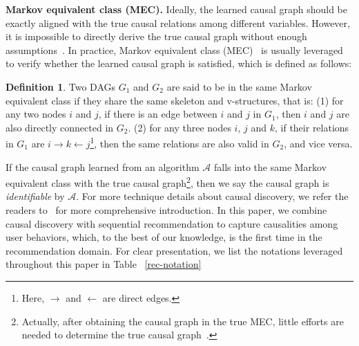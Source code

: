 \documentclass[conference]{IEEEtran}
\theoremstyle{definition}
\newtheorem{definition}{Definition}
\theoremstyle{theorem}
\theoremstyle{proof}
\theoremstyle{remark}
\begin{document}
\noindent
\textbf{Markov equivalent class (MEC).}
Ideally, the learned causal graph should be exactly aligned with the true causal relations among different variables.
However, it is impossible to directly derive the true causal graph without enough assumptions~\cite{brouillard2020differentiable}.
In practice, Markov equivalent class (MEC)~\cite{brouillard2020differentiable} is usually leveraged to verify whether the learned causal graph is satisfied, which is defined as follows:
\begin{definition}
	Two DAGs $G_1$ and $G_2$ are said to be in the same Markov equivalent class if they share the same skeleton and v-structures, that is:
	(1) {for any two nodes $i$ and $j$, if there is an edge between $i$ and $j$ in $G_1$, then $i$ and $j$ are also directly connected in $G_2$.}
	(2) {for any three nodes $i$, $j$ and $k$, if their relations in $G_1$ are $i\rightarrow k\leftarrow j$\footnote{Here, $\rightarrow$ and $\leftarrow$ are direct edges.}, then the same relations are also valid in $G_2$, and vice versa.}
\end{definition}
If the causal graph learned from an algorithm $\mathcal{A}$ falls into the same Markov equivalent class with the true causal graph\footnote{Actually, after obtaining the causal graph in the true MEC, little efforts are needed to determine the true causal graph~\cite{brouillard2020differentiable}.}, then we say the causal graph is \textit{identifiable} by $\mathcal{A}$.
For more technique details about causal discovery, we refer the readers to~\cite{brouillard2020differentiable} for more comprehensive introduction.
In this paper, we combine causal discovery with sequential recommendation to capture causalities among user behaviors, which, to the best of our knowledge, is the first time in the recommendation domain.
For clear presentation, we list the notations leveraged throughout this paper in Table ~\ref{rec-notation}
\end{document}
